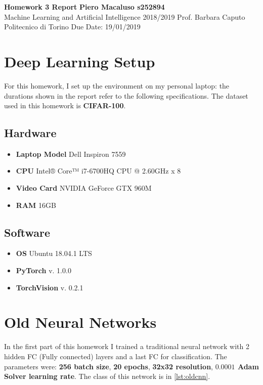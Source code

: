 \documentclass[a4paper, 11pt]{article}
\begin{document}
	\noindent
	\large\textbf{Homework 3 Report} \hfill \textbf{Piero Macaluso s252894} \\
	\normalsize Machine Learning and Artificial Intelligence 2018/2019 \hfill Prof. Barbara Caputo  \\
	\normalsize Politecnico di Torino \hfill Due Date: 19/01/2019 
	
	 
	\section*{Deep Learning Setup}
	For this homework, I set up the environment on my personal laptop: the durations shown in the report refer to the following specifications. The dataset used in this homework is \textbf{CIFAR-100}.
	\subsection*{Hardware}
	\begin{itemize}
		\item \textbf{Laptop Model} Dell Inspiron 7559
		\item \textbf{CPU} Intel® Core™ i7-6700HQ CPU @ 2.60GHz x 8 
		\item \textbf{Video Card} NVIDIA GeForce GTX 960M
		\item \textbf{RAM} 16GB
	\end{itemize}
	
	\subsection*{Software}
	\begin{itemize}
		\item \textbf{OS} Ubuntu 18.04.1 LTS
		\item \textbf{PyTorch} v. 1.0.0
		\item \textbf{TorchVision} v. 0.2.1
	\end{itemize}
	
	
	\section{Old Neural Networks} \label{oldcnn}
	
	
	
	In the first part of this homework I trained a traditional neural network with 2 hidden FC (Fully connected) layers and a last FC for classification. The parameters were: \textbf{256 batch size}, \textbf{20 epochs}, \textbf{32x32 resolution}, \textbf{$\boldsymbol{0.0001}$ Adam Solver learning rate}. The class of this network is in \vref{lst:oldcnn}.
	
\end{document}
